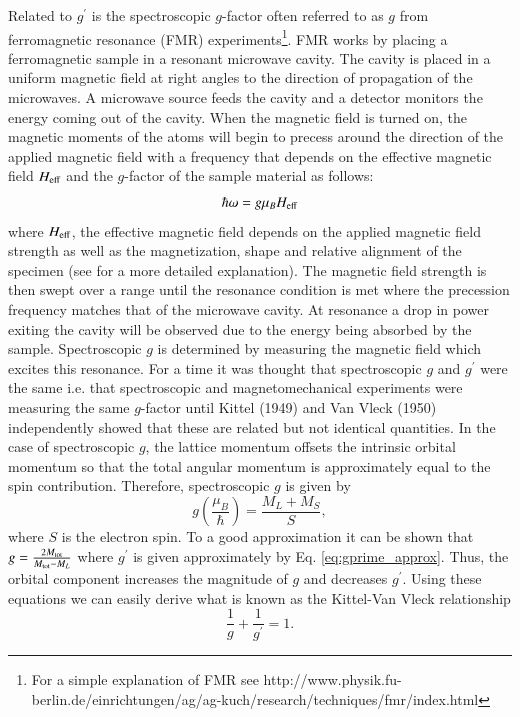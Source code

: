 \documentclass[preprint,12pt]{elsarticle}
\begin{document}
Related to $g^{\prime}$ is the spectroscopic $g$-factor often referred to as $g$ from ferromagnetic resonance (FMR) experiments\footnote{For a simple explanation of FMR see http://www.physik.fu-berlin.de/einrichtungen/ag/ag-kuch/research/techniques/fmr/index.html}. FMR works by placing a ferromagnetic sample in a resonant microwave cavity. The cavity is placed in a uniform magnetic field at right angles to the direction of propagation of the microwaves. A microwave source feeds the cavity and a detector monitors the energy coming out of the cavity. When the magnetic field is turned on, the magnetic moments of the atoms will begin to precess around the direction of the applied magnetic field with a frequency that depends on the effective magnetic field $H_{\rm eff}$ and the $g$-factor of the sample material as follows:
\begin{equation}
\hbar\omega=g\mu_BH_{\rm eff}
\label{eq:fmr}
\end{equation}
where $H_{\rm eff}$, the effective magnetic field depends on the applied magnetic field strength as well as the magnetization, shape and relative alignment of the specimen (see \cite{Kittel1949, Smit1959} for a more detailed explanation). The magnetic field strength is then swept over a range until the resonance condition is met where the precession frequency matches that of the microwave cavity. At resonance a drop in power exiting the cavity will be observed due to the energy being absorbed by the sample. Spectroscopic $g$ is determined by measuring the magnetic field which excites this resonance. For a time it was thought that spectroscopic $g$ and $g^{\prime}$ were the same i.e. that spectroscopic and magnetomechanical experiments were measuring the same $g$-factor until Kittel (1949)\cite{Kittel1949} and Van Vleck (1950)\cite{Vleck1950} independently showed that these are related but not identical quantities. In the case of spectroscopic $g$, the lattice momentum offsets the intrinsic orbital momentum so that the total angular momentum is approximately equal to the spin contribution\cite{Kittel1949, Reck1969}. Therefore, spectroscopic $g$ is given by
\begin{equation}
g\left(\frac{\mu_B}{\hbar}\right)=\frac{M_{L}+M_{S}}{S},
\end{equation}
where $S$ is the electron spin. To a good approximation it can be shown that $g=\frac{2M_{\rm tot}}{M_{\rm tot}-{M_{L}}}$ where $g^{\prime}$ is given approximately by Eq. \ref{eq:gprime_approx}. Thus, the orbital component increases the magnitude of $g$ and decreases $g^{\prime}$. Using these equations we can easily derive what is known as the Kittel-Van Vleck relationship 
\begin{equation}
\frac{1}{g}+\frac{1}{g^{\prime}}=1.
\label{eq:kittelvanvleck}
\end{equation}
\end{document}
